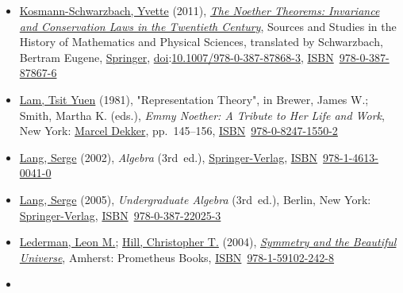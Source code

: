 \begin{itemize}
\item
  \href{https://en.wikipedia.org/wiki/Yvette_Kosmann-Schwarzbach}{Kosmann-Schwarzbach, Yvette} (2011), \href{https://link.springer.com/book/10.1007/978-0-387-87868-3}{\emph{The Noether Theorems: Invariance and Conservation Laws in the Twentieth Century}}, Sources and Studies in the History of Mathematics and Physical Sciences, translated by Schwarzbach, Bertram Eugene, \href{https://en.wikipedia.org/wiki/Springer_Science+Business_Media}{Springer}, \href{https://en.wikipedia.org/wiki/Doi_(identifier)}{doi}:\href{https://doi.org/10.1007\%2F978-0-387-87868-3}{10.1007/978-0-387-87868-3}, \href{https://en.wikipedia.org/wiki/ISBN_(identifier)}{ISBN}{~}\href{https://en.wikipedia.org/wiki/Special:BookSources/978-0-387-87867-6}{978-0-387-87867-6}{}
\item
  \href{https://en.wikipedia.org/wiki/Tsit_Yuen_Lam}{Lam, Tsit Yuen} (1981), "Representation Theory", in Brewer, James W.; Smith, Martha K. (eds.), \emph{Emmy Noether: A Tribute to Her Life and Work}, New York: \href{https://en.wikipedia.org/wiki/Marcel_Dekker}{Marcel Dekker}, pp.{~}{145--}156, \href{https://en.wikipedia.org/wiki/ISBN_(identifier)}{ISBN}{~}\href{https://en.wikipedia.org/wiki/Special:BookSources/978-0-8247-1550-2}{978-0-8247-1550-2}{}
\item
  \href{https://en.wikipedia.org/wiki/Serge_Lang}{Lang, Serge} (2002), \emph{Algebra} (3rd{~}ed.), \href{https://en.wikipedia.org/wiki/Springer-Verlag}{Springer-Verlag}, \href{https://en.wikipedia.org/wiki/ISBN_(identifier)}{ISBN}{~}\href{https://en.wikipedia.org/wiki/Special:BookSources/978-1-4613-0041-0}{978-1-4613-0041-0}{}
\item
  \href{https://en.wikipedia.org/wiki/Serge_Lang}{Lang, Serge} (2005), \emph{Undergraduate Algebra} (3rd{~}ed.), Berlin, New York: \href{https://en.wikipedia.org/wiki/Springer-Verlag}{Springer-Verlag}, \href{https://en.wikipedia.org/wiki/ISBN_(identifier)}{ISBN}{~}\href{https://en.wikipedia.org/wiki/Special:BookSources/978-0-387-22025-3}{978-0-387-22025-3}{}
\item
  \href{https://en.wikipedia.org/wiki/Leon_M._Lederman}{Lederman, Leon M.}; \href{https://en.wikipedia.org/wiki/Christopher_T._Hill}{Hill, Christopher T.} (2004), \href{https://archive.org/details/symmetrybeautifu00lede}{\emph{Symmetry and the Beautiful Universe}}, Amherst: Prometheus Books, \href{https://en.wikipedia.org/wiki/ISBN_(identifier)}{ISBN}{~}\href{https://en.wikipedia.org/wiki/Special:BookSources/978-1-59102-242-8}{978-1-59102-242-8}{}
\item

\end{itemize}
